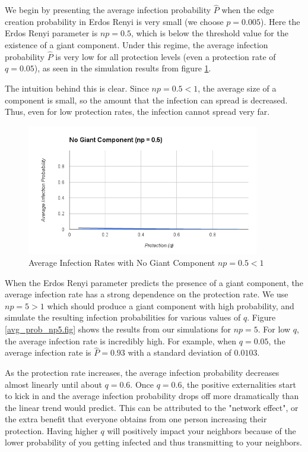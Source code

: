 \documentclass{article}
\theoremstyle{plain}
\begin{document}
We begin by presenting the average infection probability $\hat{P}$ when the edge creation probability in Erdos Renyi is very small (we choose $p = 0.005$). Here the Erdos Renyi parameter is $np = 0.5$, which is below the threshold value for the existence of a giant component. Under this regime, the average infection probability $\hat{P}$ is very low for all protection levels (even a protection rate of $q = 0.05$), as seen in the simulation results from figure \ref{avg_prob_np05.fig}.

The intuition behind this is clear. Since $np = 0.5 < 1$, the average size of a component is small, so the amount that the infection can spread is decreased. Thus, even for low protection rates, the infection cannot spread very far.

\begin{figure}[H]
  \centering
  \includegraphics[width=4in]{avg_prob_np05.png}
  \caption{Average Infection Rates with No Giant Component $np = 0.5 < 1$}
  \label{avg_prob_np05.fig}
\end{figure}

When the Erdos Renyi parameter predicts the presence of a giant component, the average infection rate has a strong dependence on the protection rate. We use $np = 5 > 1$ which should produce a giant component with high probability, and simulate the resulting infection probabilities for various values of $q$. Figure \ref{avg_prob_np5.fig} shows the results from our simulations for $np = 5$. For low $q$, the average infection rate is incredibly high. For example, when $q = 0.05$, the average infection rate is $\hat{P} = 0.93$ with a standard deviation of $0.0103$.

As the protection rate increases, the average infection probability decreases almost linearly until about $q = 0.6$. Once $q = 0.6$, the positive externalities start to kick in and the average infection probability drops off more dramatically than the linear trend would predict. This can be attributed to the "network effect", or the extra benefit that everyone obtains from one person increasing their protection. Having higher $q$ will positively impact your neighbors because of the lower probability of you getting infected and thus transmitting to your neighbors. 
\end{document}
